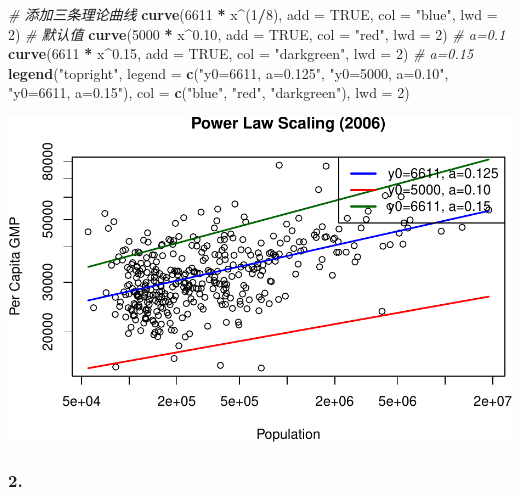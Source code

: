 \documentclass[
]{article}
\newenvironment{Shaded}{\begin{snugshade}}{\end{snugshade}}
\newcommand{\AttributeTok}[1]{\textcolor[rgb]{0.13,0.29,0.53}{#1}}
\newcommand{\CommentTok}[1]{\textcolor[rgb]{0.56,0.35,0.01}{\textit{#1}}}
\newcommand{\ConstantTok}[1]{\textcolor[rgb]{0.56,0.35,0.01}{#1}}
\newcommand{\DecValTok}[1]{\textcolor[rgb]{0.00,0.00,0.81}{#1}}
\newcommand{\FloatTok}[1]{\textcolor[rgb]{0.00,0.00,0.81}{#1}}
\newcommand{\FunctionTok}[1]{\textcolor[rgb]{0.13,0.29,0.53}{\textbf{#1}}}
\newcommand{\NormalTok}[1]{#1}
\newcommand{\SpecialCharTok}[1]{\textcolor[rgb]{0.81,0.36,0.00}{\textbf{#1}}}
\newcommand{\StringTok}[1]{\textcolor[rgb]{0.31,0.60,0.02}{#1}}
\begin{document}
\begin{Shaded}
\begin{Highlighting}[]
\CommentTok{\# 添加三条理论曲线}
\FunctionTok{curve}\NormalTok{(}\DecValTok{6611} \SpecialCharTok{*}\NormalTok{ x}\SpecialCharTok{\^{}}\NormalTok{(}\DecValTok{1}\SpecialCharTok{/}\DecValTok{8}\NormalTok{), }\AttributeTok{add =} \ConstantTok{TRUE}\NormalTok{, }\AttributeTok{col =} \StringTok{"blue"}\NormalTok{, }\AttributeTok{lwd =} \DecValTok{2}\NormalTok{)      }\CommentTok{\# 默认值}
\FunctionTok{curve}\NormalTok{(}\DecValTok{5000} \SpecialCharTok{*}\NormalTok{ x}\SpecialCharTok{\^{}}\FloatTok{0.10}\NormalTok{, }\AttributeTok{add =} \ConstantTok{TRUE}\NormalTok{, }\AttributeTok{col =} \StringTok{"red"}\NormalTok{, }\AttributeTok{lwd =} \DecValTok{2}\NormalTok{)        }\CommentTok{\# a=0.1}
\FunctionTok{curve}\NormalTok{(}\DecValTok{6611} \SpecialCharTok{*}\NormalTok{ x}\SpecialCharTok{\^{}}\FloatTok{0.15}\NormalTok{, }\AttributeTok{add =} \ConstantTok{TRUE}\NormalTok{, }\AttributeTok{col =} \StringTok{"darkgreen"}\NormalTok{, }\AttributeTok{lwd =} \DecValTok{2}\NormalTok{)  }\CommentTok{\# a=0.15}
\FunctionTok{legend}\NormalTok{(}\StringTok{"topright"}\NormalTok{, }\AttributeTok{legend =} \FunctionTok{c}\NormalTok{(}\StringTok{"y0=6611, a=0.125"}\NormalTok{, }\StringTok{"y0=5000, a=0.10"}\NormalTok{, }\StringTok{"y0=6611, a=0.15"}\NormalTok{),}
       \AttributeTok{col =} \FunctionTok{c}\NormalTok{(}\StringTok{"blue"}\NormalTok{, }\StringTok{"red"}\NormalTok{, }\StringTok{"darkgreen"}\NormalTok{), }\AttributeTok{lwd =} \DecValTok{2}\NormalTok{)}
\end{Highlighting}
\end{Shaded}

\includegraphics{Homework-03_files/figure-latex/unnamed-chunk-1-1.pdf}

\subsubsection{2.}\label{section-1}
\end{document}
